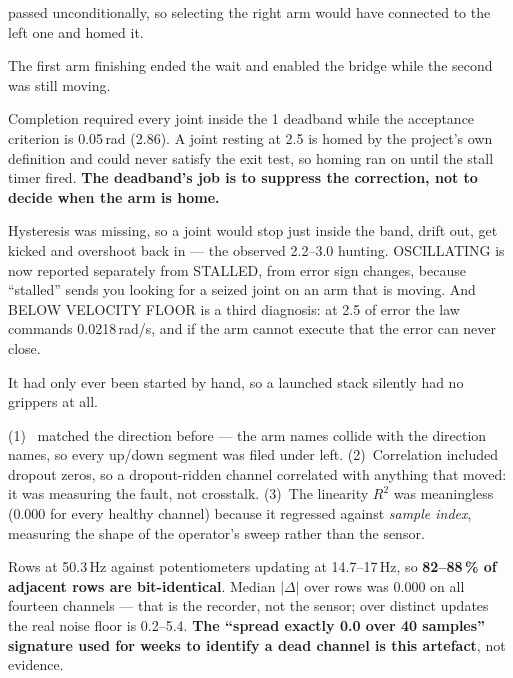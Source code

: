 { passed 
unconditionally, so selecting the right arm would have connected to the left
one and homed it.}

{The first arm finishing ended the wait and enabled the bridge while the second
was still moving.}

{Completion required every joint inside the 1\dg{} deadband while the
acceptance criterion is 0.05\,rad (2.86\dg). A joint resting at 2.5\dg{} is
homed by the project's own definition and could never satisfy the exit test, so
homing ran on until the stall timer fired. \textbf{The deadband's job is to
suppress the correction, not to decide when the arm is home.}}

{Hysteresis was missing, so a joint would stop just inside the band, drift out,
get kicked and overshoot back in --- the observed 2.2--3.0\dg{} hunting.
OSCILLATING is now reported separately from STALLED, from error sign changes,
because ``stalled'' sends you looking for a seized joint on an arm that is
moving. And BELOW VELOCITY FLOOR is a third diagnosis: at 2.5\dg{} of error the
law commands 0.0218\,rad/s, and if the arm cannot execute that the error can
never close.}

{It had only ever been started by hand, so a launched stack silently had no
grippers at all.}

{(1)~ matched the direction  before  ---
the arm names collide with the direction names, so every up/down segment was
filed under left. (2)~Correlation included dropout zeros, so a dropout-ridden
channel correlated with anything that moved: it was measuring the fault, not
crosstalk. (3)~The linearity $R^2$ was meaningless (0.000 for every healthy
channel) because it regressed against \emph{sample index}, measuring the shape
of the operator's sweep rather than the sensor.}


{Rows at 50.3\,Hz against potentiometers updating at 14.7--17\,Hz, so
\textbf{82--88\,\% of adjacent rows are bit-identical}. Median $|\Delta|$ over
rows was 0.000 on all fourteen channels --- that is the recorder, not the
sensor; over distinct updates the real noise floor is 0.2--5.4\dg.
\textbf{The ``spread exactly 0.0 over 40 samples'' signature used for weeks to
identify a dead channel is this artefact}, not evidence.}

